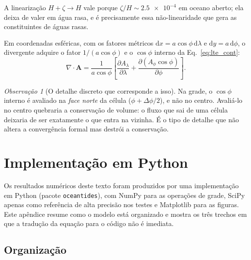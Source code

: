 \documentclass[11pt,a4paper,oneside]{report}
\theoremstyle{definition}
\theoremstyle{plain}
\theoremstyle{remark}
\newtheorem{observacao}[definicao]{Observação}
\newcommand{\vect}[1]{\bm{#1}}
\newcommand{\pd}[2]{\frac{\partial #1}{\partial #2}}
\newcommand{\dd}{\mathrm{d}}
\begin{document}
A linearização $H+\zeta\to H$ vale porque $\zeta/H\sim\num{2.5e-4}$ em oceano
aberto; ela deixa de valer em água rasa, e é precisamente essa não-linearidade
que gera as constituintes de águas rasas.

Em coordenadas esféricas, com os fatores métricos
$\dd x=a\cos\phi\,\dd\lambda$ e $\dd y=a\,\dd\phi$, o divergente adquire o
fator $1/(a\cos\phi)$ e o $\cos\phi$ interno da Eq.~\eqref{eq:lte_cont}:
\begin{equation}
\nabla\cdot\vect{A}=\frac{1}{a\cos\phi}
\left[\pd{A_\lambda}{\lambda}+\pd{(A_\phi\cos\phi)}{\phi}\right].
\end{equation}

\begin{observacao}[O detalhe discreto que corresponde a isso]
Na grade, o $\cos\phi$ interno é avaliado na \emph{face norte} da célula
($\phi+\Delta\phi/2$), e não no centro. Avaliá-lo no centro quebraria a
conservação de volume: o fluxo que sai de uma célula deixaria de ser
exatamente o que entra na vizinha. É o tipo de detalhe que não altera a
convergência formal mas destrói a conservação.
\end{observacao}

\chapter{Implementação em Python}
\label{ap:python}

Os resultados numéricos deste texto foram produzidos por uma implementação em
Python (pacote \texttt{oceantides}), com NumPy para as operações de grade,
SciPy apenas como referência de alta precisão nos testes e Matplotlib para as
figuras. Este apêndice resume como o modelo está organizado e mostra os três
trechos em que a tradução da equação para o código não é imediata.

\section*{Organização}
\end{document}
